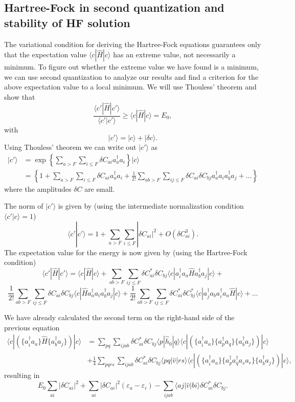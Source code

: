 \documentclass[graybox,sectrefs,envcountresetchap,open=right]{svmonodo}
\begin{document}
\subsection{Hartree-Fock in second quantization and stability of HF solution}

The variational condition for deriving the Hartree-Fock equations guarantees only that the expectation value $\langle c | \hat{H} | c \rangle$ has an extreme value, not necessarily a minimum. To figure out whether the extreme value we have found  is a minimum, we can use second quantization to analyze our results and find a criterion 
for the above expectation value to a local minimum. We will use Thouless' theorem and show that
\[
\frac{\langle c' |\hat{H} | c'\rangle}{\langle c' |c'\rangle} \ge \langle c |\hat{H} | c\rangle= E_0,
\]
with
\[
 {|c'\rangle} = {|c\rangle + |\delta c\rangle}.
\]
Using Thouless' theorem we can write out ${|c'\rangle}$ as
\begin{align}
 {|c'\rangle}&=\exp\left\{\sum_{a > F}\sum_{i \le F}\delta C_{ai}a_{a}^{\dagger}a_{i}\right\}| c\rangle\\ 
&=\left\{1+\sum_{a > F}\sum_{i \le F}\delta C_{ai}a_{a}^{\dagger}
a_{i}+\frac{1}{2!}\sum_{ab > F}\sum_{ij \le F}\delta C_{ai}\delta C_{bj}a_{a}^{\dagger}a_{i}a_{b}^{\dagger}a_{j}+\dots\right\}
\end{align}
where the amplitudes $\delta C$ are small.


The norm of $|c'\rangle$ is given by (using the intermediate normalization condition $\langle c' |c\rangle=1$) 
\[
\langle c' | c'\rangle = 1+\sum_{a>F}
\sum_{i\le F}|\delta C_{ai}|^2+O(\delta C_{ai}^3).
\]
The expectation value for the energy is now given by (using the Hartree-Fock condition)
\[
\langle c' |\hat{H} | c'\rangle=\langle c |\hat{H} | c\rangle +
\sum_{ab>F}
\sum_{ij\le F}\delta C_{ai}^*\delta C_{bj}\langle c |a_{i}^{\dagger}a_{a}\hat{H}a_{b}^{\dagger}a_{j}|c\rangle+
\]
\[
\frac{1}{2!}\sum_{ab>F}
\sum_{ij\le F}\delta C_{ai}\delta C_{bj}\langle c |\hat{H}a_{a}^{\dagger}a_{i}a_{b}^{\dagger}a_{j}|c\rangle+\frac{1}{2!}\sum_{ab>F}
\sum_{ij\le F}\delta C_{ai}^*\delta C_{bj}^*\langle c|a_{j}^{\dagger}a_{b}a_{i}^{\dagger}a_{a}\hat{H}|c\rangle
+\dots
\] 





We have already calculated the second term on the right-hand side of the previous equation
\begin{align}
\langle c | \left(\{a^\dagger_i a_a\} \hat{H} \{a^\dagger_b a_j\} \right) | c\rangle&=\sum_{pq} \sum_{ijab}\delta C_{ai}^*\delta C_{bj} \langle p|\hat{h}_0 |q\rangle 
            \langle c | \left(\{a^{\dagger}_i a_a\}\{a^{\dagger}_pa_q\} 
             \{a^{\dagger}_b a_j\} \right)| c\rangle\\
& +\frac{1}{4} \sum_{pqrs} \sum_{ijab}\delta C_{ai}^*\delta C_{bj} \langle pq| \hat{v}|rs\rangle 
            \langle c | \left(\{a^\dagger_i a_a\}\{a^{\dagger}_p a^{\dagger}_q a_s  a_r\} \{a^{\dagger}_b a_j\} \right)| c\rangle ,
\end{align}
resulting in
\[
E_0\sum_{ai}|\delta C_{ai}|^2+\sum_{ai}|\delta C_{ai}|^2(\varepsilon_a-\varepsilon_i)-\sum_{ijab} \langle aj|\hat{v}| bi\rangle \delta C_{ai}^*\delta C_{bj}.
\]
\end{document}
